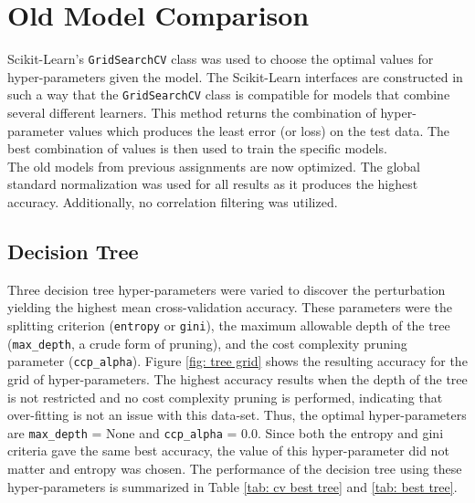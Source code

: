 \documentclass[paper=a4, fontsize=11pt]{scrartcl} %
\begin{document}
\section{Old Model Comparison} \label{sec: compare}

Scikit-Learn's \verb|GridSearchCV| class was used to choose the optimal values for hyper-parameters given the model.
The Scikit-Learn interfaces are constructed in such a way that the \verb|GridSearchCV| class is compatible for models that combine several different learners. 
This method returns the combination of hyper-parameter values which produces the least error (or loss) on the test data. 
The best combination of values is then used to train the specific models.
\\


The old models from previous assignments are now optimized. The global standard normalization was used for all results as it produces the highest accuracy. Additionally, no correlation filtering was utilized.


\subsection*{Decision Tree}
Three decision tree hyper-parameters were varied to discover the perturbation yielding the highest mean cross-validation accuracy.
These parameters were the splitting criterion (\verb|entropy| or \verb|gini|), the maximum allowable depth of the tree (\verb|max_depth|, a crude form of pruning), and the cost complexity pruning parameter (\verb|ccp_alpha|).
Figure \ref{fig: tree grid} shows the resulting accuracy for the grid of hyper-parameters.
The highest accuracy results when the depth of the tree is not restricted and no cost complexity pruning is performed, indicating that over-fitting is not an issue with this data-set.
Thus, the optimal hyper-parameters are \verb|max_depth| = None and \verb|ccp_alpha| = 0.0.
Since both the entropy and gini criteria gave the same best accuracy, the value of this hyper-parameter did not matter and entropy was chosen.
The performance of the decision tree using these hyper-parameters is summarized in Table \ref{tab: cv best tree} and \ref{tab: best tree}.
\end{document}
